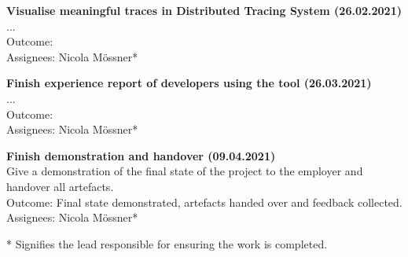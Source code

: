 \documentclass[11pt]{article}
\begin{document}
\textbf{Visualise meaningful traces in Distributed Tracing System (26.02.2021)}\\
...\\
Outcome: \\
Assignees: Nicola M\"{o}ssner*

\textbf{Finish experience report of developers using the tool (26.03.2021)}\\
...\\
Outcome: \\
Assignees: Nicola M\"{o}ssner*

\textbf{Finish demonstration and handover (09.04.2021)}\\
Give a demonstration of the final state of the project to the employer and handover all artefacts.\\
Outcome: Final state demonstrated, artefacts handed over and feedback collected.\\
Assignees: Nicola M\"{o}ssner*

* Signifies the lead responsible for ensuring the work is completed.




\end{document}
